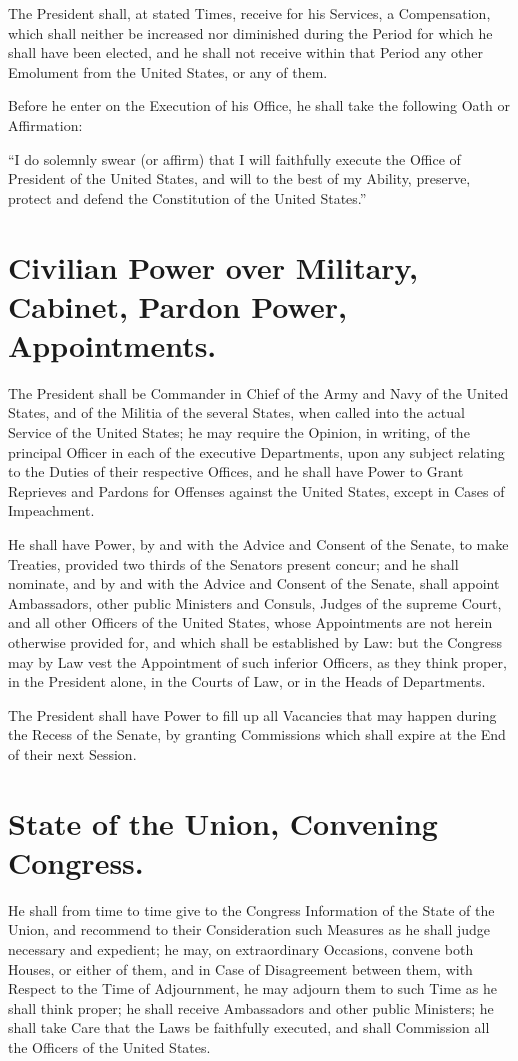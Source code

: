 \documentclass[12pt]{constitution}
\begin{document}
The President shall, at stated Times, receive for his Services, a Compensation,
which shall neither be increased nor diminished during the Period for which he
shall have been elected, and he shall not receive within that Period any other
Emolument from the United States, or any of them.

Before he enter on the Execution of his Office, he shall take the following
Oath or Affirmation:

``I do solemnly swear (or affirm) that I will faithfully execute the Office of
President of the United States, and will to the best of my Ability, preserve,
protect and defend the Constitution of the United States.''


\section{Civilian Power over Military, Cabinet, Pardon Power, Appointments.}
The President shall be Commander in Chief of the Army and Navy of the United
States, and of the Militia of the several States, when called into the actual
Service of the United States; he may require the Opinion, in writing, of the
principal Officer in each of the executive Departments, upon any subject
relating to the Duties of their respective Offices, and he shall have Power to
Grant Reprieves and Pardons for Offenses against the United States, except in
Cases of Impeachment.

He shall have Power, by and with the Advice and Consent of the Senate, to make
Treaties, provided two thirds of the Senators present concur; and he shall
nominate, and by and with the Advice and Consent of the Senate, shall appoint
Ambassadors, other public Ministers and Consuls, Judges of the supreme Court,
and all other Officers of the United States, whose Appointments are not herein
otherwise provided for, and which shall be established by Law: but the Congress
may by Law vest the Appointment of such inferior Officers, as they think
proper, in the President alone, in the Courts of Law, or in the Heads of
Departments.

The President shall have Power to fill up all Vacancies that may happen during
the Recess of the Senate, by granting Commissions which shall expire at the End
of their next Session.


\section{State of the Union, Convening Congress.}
He shall from time to time give to the Congress Information of the State of the
Union, and recommend to their Consideration such Measures as he shall judge
necessary and expedient; he may, on extraordinary Occasions, convene both
Houses, or either of them, and in Case of Disagreement between them, with
Respect to the Time of Adjournment, he may adjourn them to such Time as he
shall think proper; he shall receive Ambassadors and other public Ministers; he
shall take Care that the Laws be faithfully executed, and shall Commission all
the Officers of the United States.
\end{document}
